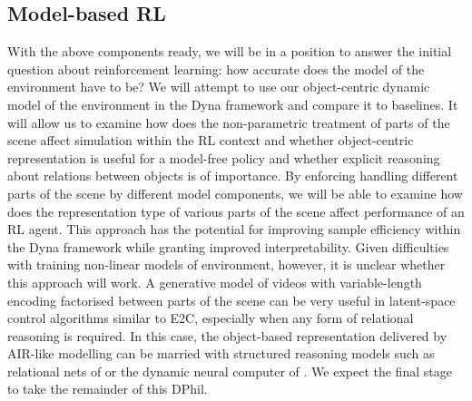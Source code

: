     \subsection{Model-based RL}
        With the above components ready, we will be in a position to answer the initial question about reinforcement learning:
        how accurate does the model of the environment have to be?
        We will attempt to use our object-centric dynamic model of the environment in the Dyna framework and compare it to baselines.
        It will allow us to examine how does the non-parametric treatment of parts of the scene affect simulation within the RL context and whether object-centric representation is useful for a model-free policy and whether explicit reasoning about relations between objects is of importance.
        By enforcing handling different parts of the scene by different model components, we will be able to examine how does the representation type of various parts of the scene affect performance of an RL agent. 
        This approach has the potential for improving sample efficiency within the Dyna framework while granting improved interpretability. Given difficulties with training non-linear models of environment, however, it is unclear whether this approach will work. A generative model of videos with variable-length encoding factorised between parts of the scene can be very useful in latent-space control algorithms similar to E2C, especially when any form of relational reasoning is required. In this case, the object-based representation delivered by AIR-like modelling can be married with structured reasoning models such as relational nets of \cite{Santoro2017} or the dynamic neural computer of \cite{Graves2016}.
        We expect the final stage to take the remainder of this DPhil.

